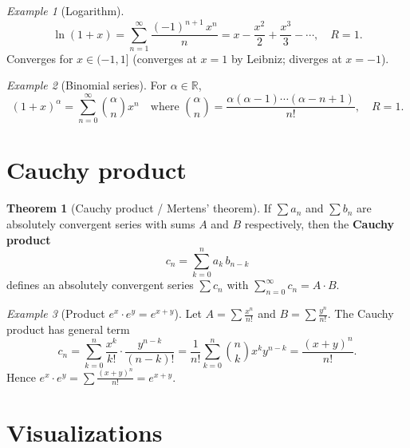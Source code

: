 \documentclass[12pt,a4paper,openany]{book}
\newcommand{\R}{\mathbb{R}}
\theoremstyle{definition}
\newtheorem{theorem}{Theorem}[chapter]
\theoremstyle{remark}
\newtheorem{example}{Example}[chapter]
\begin{document}
\begin{example}[Logarithm]\label{ex:log-series}
\[
   \ln(1+x) = \sum_{n=1}^{\infty}\frac{(-1)^{n+1}\,x^n}{n}
   = x - \frac{x^2}{2} + \frac{x^3}{3} - \cdots, \quad R = 1.
\]
Converges for $x \in (-1, 1]$ (converges at $x=1$ by Leibniz; diverges at $x = -1$).
\end{example}

\begin{example}[Binomial series]\label{ex:binomial-series}
For $\alpha \in \R$,
\[
   (1+x)^\alpha
   = \sum_{n=0}^{\infty}\binom{\alpha}{n}x^n
   \quad\text{where } \binom{\alpha}{n}
   = \frac{\alpha(\alpha-1)\cdots(\alpha-n+1)}{n!}, \quad R = 1.
\]
\end{example}

\section{Cauchy product}\label{sec:cauchy-product}

\begin{theorem}[Cauchy product / Mertens' theorem]\label{thm:cauchy-product}
If $\sum a_n$ and $\sum b_n$ are absolutely convergent series with sums $A$
and $B$ respectively, then the \textbf{Cauchy product}
\[
   c_n = \sum_{k=0}^{n} a_k\, b_{n-k}
\]
defines an absolutely convergent series $\sum c_n$ with
$\displaystyle\sum_{n=0}^{\infty} c_n = A \cdot B$.
\end{theorem}

\begin{example}[Product $e^x \cdot e^y = e^{x+y}$]\label{ex:exp-product}
Let $A = \sum \frac{x^n}{n!}$ and $B = \sum \frac{y^n}{n!}$. The Cauchy
product has general term
\[
   c_n = \sum_{k=0}^{n}\frac{x^k}{k!}\cdot\frac{y^{n-k}}{(n-k)!}
       = \frac{1}{n!}\sum_{k=0}^{n}\binom{n}{k}x^k y^{n-k}
       = \frac{(x+y)^n}{n!}.
\]
Hence $e^x \cdot e^y = \sum \frac{(x+y)^n}{n!} = e^{x+y}$.
\end{example}

\section{Visualizations}\label{sec:series-tikz}
\end{document}
